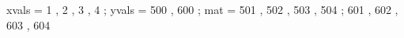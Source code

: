 \begin{functable}
    xvals = 1  , 2  , 3  , 4 ;
    yvals = 500 , 600 ;
    mat   = 501 , 502 , 503 , 504 ;
            601 , 602 , 603 , 604
\end{functable}
